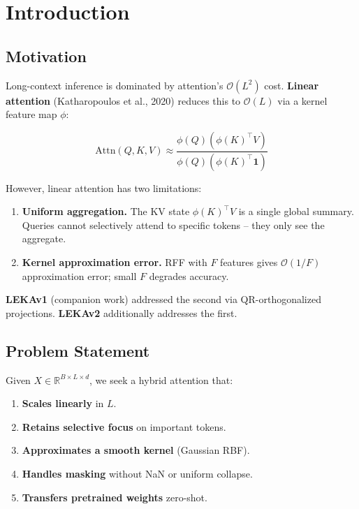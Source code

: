 \section{Introduction}

\subsection{Motivation}

Long-context inference is dominated by attention's $\mathcal{O}(L^2)$ cost. 
\textbf{Linear attention} (Katharopoulos et al., 2020) reduces this to 
$\mathcal{O}(L)$ via a kernel feature map $\phi$:

\[
\text{Attn}(Q, K, V) \approx \frac{\phi(Q)(\phi(K)^\top V)}{\phi(Q)(\phi(K)^\top \mathbf{1})}
\tag{1.1}
\]

However, linear attention has two limitations:

\begin{enumerate}
\item \textbf{Uniform aggregation.} The KV state $\phi(K)^\top V$ is a single global
  summary. Queries cannot selectively attend to specific tokens -- they
  only see the aggregate.
\item \textbf{Kernel approximation error.} RFF with $F$ features gives $\mathcal{O}(1/F)$
  approximation error; small $F$ degrades accuracy.

\end{enumerate}
\textbf{LEKAv1} (companion work) addressed the second via QR-orthogonalized 
projections. \textbf{LEKAv2} additionally addresses the first.

\subsection{Problem Statement}

Given $X \in \mathbb{R}^{B \times L \times d}$, we seek a hybrid attention 
that:

\begin{enumerate}
\item \textbf{Scales linearly} in $L$.
\item \textbf{Retains selective focus} on important tokens.
\item \textbf{Approximates a smooth kernel} (Gaussian RBF).
\item \textbf{Handles masking} without NaN or uniform collapse.
\item \textbf{Transfers pretrained weights} zero-shot.

\end{enumerate}
